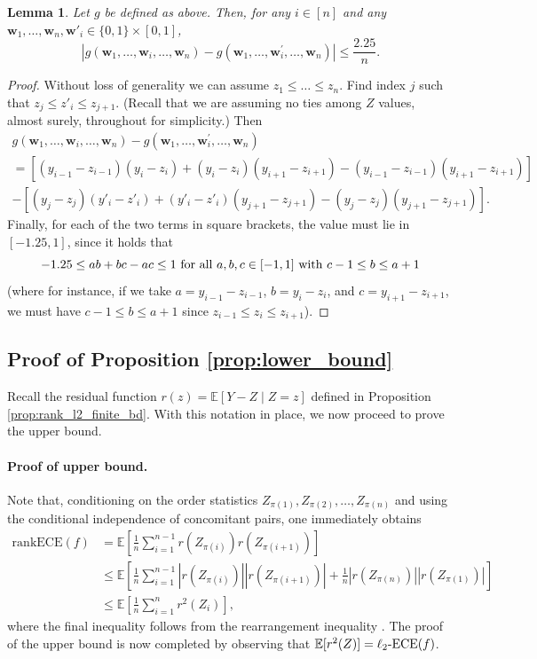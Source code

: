 \documentclass[11pt]{article}
\numberwithin{equation}{section}
\newtheorem{lemma}{Lemma}[section]
\theoremstyle{definition}
\newcommand{\E}{\mathbb{E}}
\newcommand{\bw}{\bm{w}}
\newcommand{\ECE}{\mathrm{ECE}}
\newcommand{\lECE}{\ell_2\textnormal{-}\ECE}
\newcommand{\rankECE}{\mathrm{rankECE}}
\begin{document}
\begin{lemma}\label{lem:g_diff_mcdiarmid}
    Let $g$ be defined as above. Then, for any $i\in[n]$ and any $\bw_1,\dots,\bw_n,\bw'_i\in\{0,1\}\times[0,1]$,
    \[\left|g\left(\bw_1,\ldots,\bw_i,\ldots, \bw_n\right) - g\left(\bw_1,\ldots,\bw_i^\prime,\ldots, \bw_n\right)\right|\leq \frac{2.25}{n}.\]
\end{lemma}
\begin{proof}
    Without loss of generality we can assume $z_1 \leq  \dots \leq z_n$. Find index $j$ such that $z_j\leq z'_i \leq z_{j+1}$. (Recall that we are assuming no ties among $Z$ values, almost surely, throughout for simplicity.) Then
    \begin{multline*}
    g\left(\bw_1,\ldots,\bw_i,\ldots, \bw_n\right) - g\left(\bw_1,\ldots,\bw_i^\prime,\ldots, \bw_n\right)\\
        = \left[(y_{i-1}-z_{i-1})(y_i-z_i) + (y_i-z_i)(y_{i+1}-z_{i+1}) - (y_{i-1}-z_{i-1})(y_{i+1}-z_{i+1})\right]\\
        - \left[(y_j-z_j)(y'_i-z'_i) + (y'_i - z'_i)(y_{j+1}-z_{j+1}) - (y_j-z_j)(y_{j+1}-z_{j+1})\right].
    \end{multline*}
    Finally, for each of the two terms in square brackets, the value must lie in $[-1.25,1]$, since it holds that
    \[-1.25\leq ab + bc - ac\leq 1\textnormal{ for all $a,b,c\in[-1,1]$ with $c-1\leq b\leq a+1$}\]
    (where for instance, if we take $a=y_{i-1}-z_{i-1}$, $b=y_i-z_i$, and $c=y_{i+1}-z_{i+1}$, we must have $c-1\leq b\leq a+1$ since $z_{i-1}\leq z_i\leq z_{i+1}$).
\end{proof}

\subsection{Proof of Proposition \ref{prop:lower_bound}}\label{sec:proofof_prop_lower_bound}
Recall the residual function $r(z) = \E[Y-Z\mid Z = z]$ defined in Proposition \ref{prop:rank_l2_finite_bd}. With this notation in place, we now proceed to prove the upper bound.

\paragraph{\textbf{Proof of upper bound.}}
Note that, conditioning on the order statistics $Z_{\pi(1)},Z_{\pi(2)},\ldots,Z_{\pi(n)}$ and using the conditional independence of concomitant pairs, one immediately obtains
\begin{align}
    \rankECE(f) 
    & = \E\left[\frac{1}{n}\sum_{i=1}^{n-1}r\left(Z_{\pi(i)}\right)r\left(Z_{\pi(i+1)}\right)\right]\label{eq:rank_r_equal}\\
    &\leq \E\left[\frac{1}{n}\sum_{i=1}^{n-1}\left|r\left(Z_{\pi(i)}\right)\right|\left|r\left(Z_{\pi(i+1)}\right)\right| + \frac{1}{n}\left|r(Z_{\pi(n)})\right|\left|r(Z_{\pi(1)})\right|\right]\nonumber\\
    &\leq \E\left[\frac{1}{n}\sum_{i=1}^{n}r^2(Z_i)\right]\nonumber,
\end{align}
where the final inequality follows from the rearrangement inequality \citep{hardy1952inequalities}. The proof of the upper bound is now completed by observing that $\E[r^2(Z)] = \lECE(f)$. 
\end{document}
